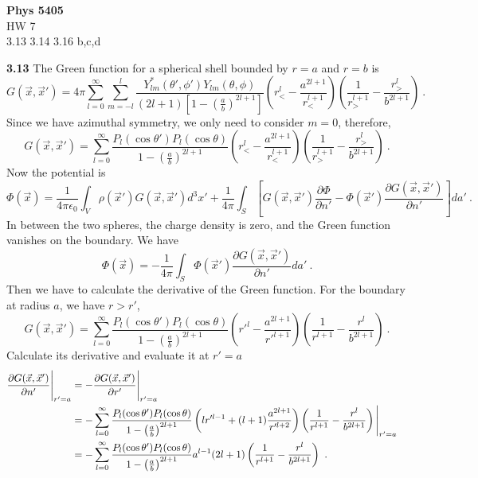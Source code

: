 \documentclass[12pt]{article}
\begin{document}
\begin{center}
{\bf Phys 5405}\\
HW 7 \\
3.13 3.14 3.16 b,c,d
\end{center}
{\bf 3.13}
The Green function for a spherical shell bounded by $r = a$ and $r = b$ is
\begin{equation}
    G(\vec x, \vec x') = 4\pi \sum_{l = 0}^\infty \sum_{m = -l}^l \frac{Y^*_{lm}(\theta', \phi') Y_{lm}(\theta, \phi)}{(2l+1)\left[1- \left(\frac{a}{b}\right)^{2l+1}\right]}\left(r^l_< - \frac{a^{2l+1}}{r^{l+1}_<}\right)\left(\frac{1}{r^{l+1}_>} - \frac{r^l_>}{b^{2l+1}}\right)~.
\end{equation}
Since we have azimuthal symmetry, we only need to consider $m = 0$, therefore,
\begin{equation}
    G(\vec x, \vec x') = \sum_{l = 0}^\infty\frac{P_l(\cos \theta') P_l(\cos \theta)}{1- \left(\frac{a}{b}\right)^{2l+1}}\left(r^l_< - \frac{a^{2l+1}}{r^{l+1}_<}\right)\left(\frac{1}{r^{l+1}_>} - \frac{r^l_>}{b^{2l+1}}\right)~.
\end{equation}
Now the potential is
\begin{equation}
    \Phi(\vec x) = \frac{1}{4\pi \epsilon_0} \int_V \rho(\vec x') G(\vec x, \vec x') d^3 x'+ \frac{1}{4\pi} \int_S\left[G(\vec x, \vec x') \frac{\partial \Phi}{\partial n'} - \Phi(\vec x') \frac{\partial G(\vec x, \vec x')}{\partial n'}\right]da'~.
\end{equation}
In between the two spheres, the charge density is zero, and the Green function vanishes on the boundary. We have
\begin{equation}
    \Phi(\vec x) = - \frac{1}{4\pi} \int_S \Phi(\vec x') \frac{\partial G(\vec x, \vec x')}{\partial n'} da'~.
\end{equation}
Then we have to calculate the derivative of the Green function. For the boundary at radius $a$, we have $r > r'$,
\begin{equation}
    G(\vec x, \vec x') = \sum_{l=0}^\infty  \frac{P_l(\cos \theta') P_l(\cos \theta)}{1 - \left(\frac{a}{b}\right)^{2l+1}} \left(r'^l - \frac{a^{2l+1}}{r'^{l+1}}\right) \left(\frac{1}{r^{l+1}} - \frac{r^l}{b^{2l+1}}\right)~.
\end{equation}
Calculate its derivative and evaluate it at $r' = a$
\begin{align}
    \frac{\partial G(\vec x, \vec x')}{\partial n'}\Bigg|_{r' = a} &= - \frac{\partial G(\vec x, \vec x')}{\partial r'} \Bigg |_{r' = a} \cr
    &= -\sum_{l=0}^\infty  \frac{P_l (\cos \theta')P_l(\cos \theta)}{1-\left(\frac{a}{b}\right)^{2l+1}}\left(l r'^{l-1} +(l+1)\frac{a^{2l+1}}{r'^{l+2}}\right) \left(\frac{1}{r^{l+1}} - \frac{r^l}{b^{2l+1}}\right) \Bigg |_{r' = a} \cr
    &=-\sum_{l=0}^\infty  \frac{P_l (\cos \theta')P_l(\cos \theta)}{1-\left(\frac{a}{b}\right)^{2l+1}}a^{l-1}(2l+1) \left(\frac{1}{r^{l+1}} - \frac{r^l}{b^{2l+1}}\right)~.
\end{align}
\end{document}
